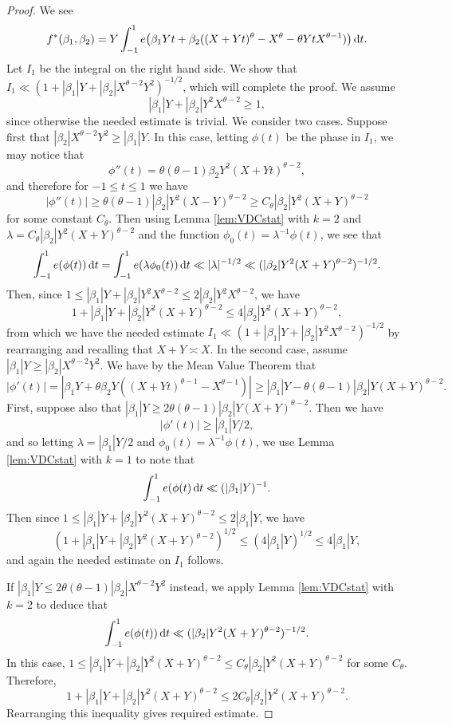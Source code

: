 \documentclass[11pt,reqno]{amsart}
\numberwithin{equation}{section}
\renewcommand{\d}{\,{\rm d}}
\begin{document}
\begin{proof} 
We see 
\[ f^*(\beta_1, \beta_2) = Y \int_{-1}^1 e\big(\beta_1Yt+\beta_2((X+Yt)^{\theta}-X^{\theta}-\theta YtX^{\theta-1} )\big)\d t. \]
Let $I_1$ be the integral on the right hand side. We show that $I_1 \ll (1+|\beta_1|Y+|\beta_2|X^{\theta-2}Y^2)^{-1/2}$, which will complete the proof. We assume 
\[|\beta_1|Y+|\beta_2|Y^{2}X^{\theta-2} \geq 1,\] 
since otherwise the needed estimate is trivial. We consider two cases. Suppose first that $|\beta_2|X^{\theta-2}Y^2 \geq |\beta_1|Y$. In this case, letting $\phi(t)$ be the phase in $I_1$, we may notice that 
\[ \phi''(t) = \theta(\theta-1)\beta_2Y^2(X+Yt)^{\theta-2}, \]
and therefore for $-1 \leq t \leq 1$ we have 
\[ |\phi''(t)| \geq \theta(\theta-1)|\beta_2|Y^2(X-Y)^{\theta-2} \geq C_{\theta}|\beta_2|Y^2(X+Y)^{\theta-2} \]
for some constant $C_\theta$. Then using Lemma \ref{lem:VDCstat} with $k = 2$ and $\lambda = C_{\theta}|\beta_2|Y^2(X+Y)^{\theta-2}$ and the function $\phi_0(t) = \lambda^{-1}\phi(t)$, we see that 
\[ \int_{-1}^1 e(\phi(t))\d t = \int_{-1}^1 e(\lambda\phi_0(t)) \d t \ll |\lambda|^{-1/2} \ll (|\beta_2|Y^2(X+Y)^{\theta-2})^{-1/2}.  \]
Then, since $1 \leq |\beta_1|Y+|\beta_2|Y^{2}X^{\theta-2} \leq 2|\beta_2|Y^{2}X^{\theta-2}$, 
we have 
\[ 1+|\beta_1|Y+|\beta_2|Y^2(X+Y)^{\theta-2} \leq 4|\beta_2|Y^2(X+Y)^{\theta-2}, \] 
from which we have the needed estimate $I_1 \ll (1+|\beta_1|Y+|\beta_2|Y^2X^{\theta-2})^{-1/2}$ by rearranging and recalling that $X+Y \asymp X$. 
In the second case, assume $|\beta_1|Y \geq |\beta_2|X^{\theta-2}Y^2$. We have by the Mean Value Theorem that 
\[ |\phi'(t)| = |\beta_1Y+\theta\beta_2Y((X+Yt)^{\theta-1}-X^{\theta-1})| \geq |\beta_1|Y-\theta(\theta-1)|\beta_2|Y(X+Y)^{\theta-2}. \]
First, suppose also that $|\beta_1|Y \geq 2\theta(\theta-1)|\beta_2|Y(X+Y)^{\theta-2}$. Then we have 
\[ |\phi'(t)| \geq |\beta_1|Y/2, \]
and so letting $\lambda = |\beta_1|Y/2$ and $\phi_0(t) = \lambda^{-1}\phi(t)$, we use Lemma \ref{lem:VDCstat} with $k = 1$ to note that
\[ \int_{-1}^1 e(\phi(t)\d t \ll (|\beta_1|Y)^{-1}. \]
Then since $1 \leq |\beta_1|Y+|\beta_2|Y^2(X+Y)^{\theta-2} \leq 2|\beta_1|Y$, we have 
\[ (1+|\beta_1|Y+|\beta_2|Y^2(X+Y)^{\theta-2})^{1/2} \leq (4|\beta_1|Y)^{1/2} \leq 4|\beta_1|Y, \]
and again the needed estimate on $I_1$ follows. 

If $|\beta_1|Y \leq 2\theta(\theta-1)|\beta_2|X^{\theta-2}Y^2$ instead, we apply Lemma \ref{lem:VDCstat} with $k = 2$ to deduce that 
\[ \int_{-1}^1 e(\phi(t))\d t \ll (|\beta_2|Y^2(X+Y)^{\theta-2})^{-1/2}. \]
In this case, $1 \leq |\beta_1|Y + |\beta_2|Y^2(X+Y)^{\theta-2} \leq  C_{\theta}|\beta_2|Y^2(X+Y)^{\theta-2}$ for some $C_{\theta}$.
Therefore, 
\[ 1+|\beta_1|Y+|\beta_2|Y^2(X+Y)^{\theta-2} \leq  2C_{\theta}|\beta_2|Y^2(X+Y)^{\theta-2}. \]
Rearranging this inequality gives required estimate. 
\end{proof}
\end{document}
